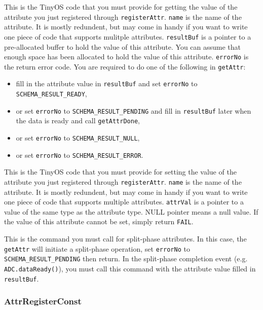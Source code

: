 \documentclass[11pt]{article}
\begin{document}
This is the TinyOS code that you must provide for getting the value of the
attribute you just registered through {\tt registerAttr}.  {\tt name} is 
the name of the attribute.  It is mostly redundent, but may come in handy
if you want to write one piece of code that supports mulitple attributes.
{\tt resultBuf} is a pointer to a pre-allocated buffer to hold the
value of this attribute.  You can assume
that enough space has been allocated to hold the value of this
attribute.  {\tt errorNo} is the return error code.  You are required
to do one of the following in {\tt getAttr}:
\begin{itemize}
\item fill in the attribute value in {\tt resultBuf} and set
{\tt *errorNo} to {\tt SCHEMA\_RESULT\_READY},
\item or set {\tt *errorNo} to
{\tt SCHEMA\_RESULT\_PENDING} and fill in {\tt resultBuf} later when the
data is ready and call {\tt getAttrDone},
\item or set {\tt *errorNo} to {\tt SCHEMA\_RESULT\_NULL},
\item or set {\tt *errorNo} to {\tt SCHEMA\_RESULT\_ERROR}.
\end{itemize}



This is the TinyOS code that you must provide for setting the value of
the attribute you just registered through {\tt registerAttr}.
{\tt name} is
the name of the attribute.  It is mostly redundent, but may come in handy
if you want to write one piece of code that supports multiple attributes.
{\tt attrVal} is a pointer to a value of the same type as the attribute type.
NULL pointer means a null value.  If the value of this attribute cannot be set,
simply return {\tt FAIL}.



This is the command you must call for split-phase attributes.  In this case,
the {\tt getAttr} will initiate a split-phase operation, set {\tt *errorNo} to 
{\tt SCHEMA\_RESULT\_PENDING} then return.  In the split-phase completion event
(e.g. {\tt ADC.dataReady()}), you must call this command with the attribute
value filled in {\tt resultBuf}.

\subsubsection{AttrRegisterConst}
\end{document}
